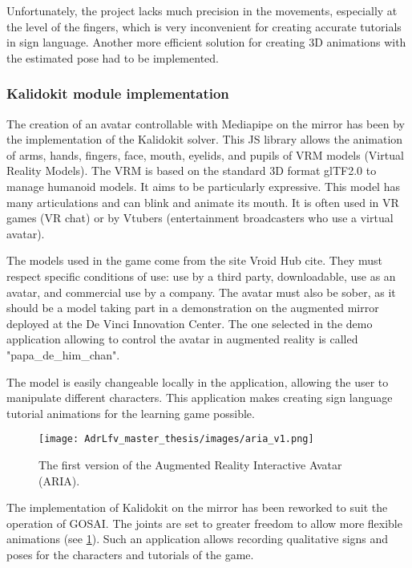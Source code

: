 Unfortunately, the project lacks much precision in the movements, especially at the level of the fingers, which is very inconvenient for creating accurate tutorials in sign language. Another more efficient solution for creating 3D animations with the estimated pose had to be implemented.

\subsubsection{Kalidokit module implementation}

The creation of an avatar controllable with Mediapipe on the mirror has been by the implementation of the Kalidokit solver. This JS library allows the animation of arms, hands, fingers, face, mouth, eyelids, and pupils of VRM models (Virtual Reality Models). The VRM is based on the standard 3D format glTF2.0 to manage humanoid models. It aims to be particularly expressive. This model has many articulations and can blink and animate its mouth. It is often used in VR games (VR chat) or by Vtubers (entertainment broadcasters who use a virtual avatar).  

The models used in the game come from the site Vroid Hub cite\cite{vroid}. They must respect specific conditions of use: use by a third party, downloadable, use as an avatar, and commercial use by a company. The avatar must also be sober, as it should be a model taking part in a demonstration on the augmented mirror deployed at the De Vinci Innovation Center. The one selected in the demo application allowing to control the avatar in augmented reality is called "papa\_de\_him\_chan". 

The model is easily changeable locally in the application, allowing the user to manipulate different characters. This application makes creating sign language tutorial animations for the learning game possible.

\begin{figure}[h]
    \centering
    \texttt{[image: AdrLfv\_master\_thesis/images/aria\_v1.png]}
    \caption{The first version of the Augmented Reality Interactive Avatar (ARIA).}
    \label{fig:aria_v1}
\end{figure}

The implementation of Kalidokit on the mirror has been reworked to suit the operation of GOSAI. The joints are set to greater freedom to allow more flexible animations (see \ref{fig:aria_v1}).
Such an application allows recording qualitative signs and poses for the characters and tutorials of the game.

